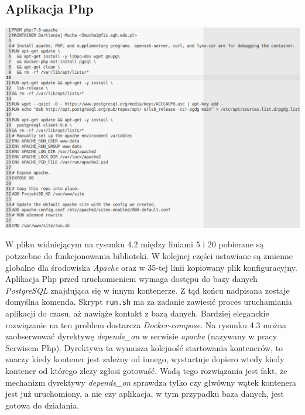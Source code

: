 \documentclass[polish, a4paper, 12pt, oneside]{book}
\begin{document}
\subsection{Aplikacja Php}
\begin{center}
\includegraphics[width=160mm]{dockerfile_php.png}
\end{center}
W pliku widniejącym na rysunku 4.2 między liniami 5 i 20 pobierane są potzzebne do funkcjonowania biblioteki. W kolejnej części ustawiane są zmienne globalne dla środowiska \textit{Apache}\cite{apache} oraz w 35-tej linii kopiowany plik konfiguracyjny. Aplikacja Php przed uruchomieniem wymaga dostępu do bazy danych \textit{PostgreSQL}\cite{postgresql} znajdująca się w innym kontenerze. Z tąd końcu nadpisana zostaje domyślna komenda. Skrypt \texttt{run.sh} ma za zadanie zawiesić proces uruchamiania aplikacji do czasu, aż nawiąże kontakt z bazą danych. Bardziej eleganckie rozwiązanie na ten problem dostarcza \textit{Docker-compose}\cite{dockercompose}. Na rysunku 4.3 można zaobserwować dyrektywę \textit{depends\_on} w serwisie \textit{apache} (nazywany w pracy Serwisem Php). Dyrektywa ta wymusza kolejność startowania kontenerów, to znaczy kiedy kontener jest zależny od innego, wystartuje dopiero wtedy kiedy kontener od którego zleży zgłosi gotowaść. Wadą tego rozwiązania jest fakt, że mechanizm dyrektywy \textit{depends\_on} sprawdza tylko czy głwówny wątek kontenera jest już uruchomiony, a nie czy aplikacja, w tym przypadku baza danych, jest gotowa do działania.
\end{document}
